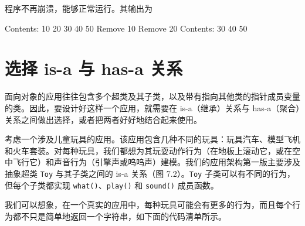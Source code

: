 程序不再崩溃，能够正常运行。其输出为

\begin{codebox}
Contents: 10 20 30 40 50 
Remove 10
Remove 20
Contents: 30 40 50 
\end{codebox}

\section{选择 is-a 与 has-a 关系}

面向对象的应用往往包含多个超类及其子类，以及带有指向其他类的指针成员变量的类。因此，要设计好这样一个应用，就需要在 is-a（继承）关系与 has-a（聚合）关系之间做出选择，或者把两者好好地结合起来使用。

考虑一个涉及儿童玩具的应用。该应用包含几种不同的玩具：玩具汽车、模型飞机和火车套装。对每种玩具，我们都想为其玩耍动作行为（在地板上滚动它，或在空中飞行它）和声音行为（引擎声或呜呜声）建模。我们的应用架构第一版主要涉及抽象超类 \texttt{Toy} 与其子类之间的 is-a 关系（图 7.2）。\texttt{Toy} 子类可以有不同的行为，但每个子类都实现 \texttt{what()}、\texttt{play()} 和 \texttt{sound()} 成员函数。


我们可以想象，在一个真实的应用中，每种玩具可能会有更多的行为，而且每个行为都不只是简单地返回一个字符串，如下面的代码清单所示。

